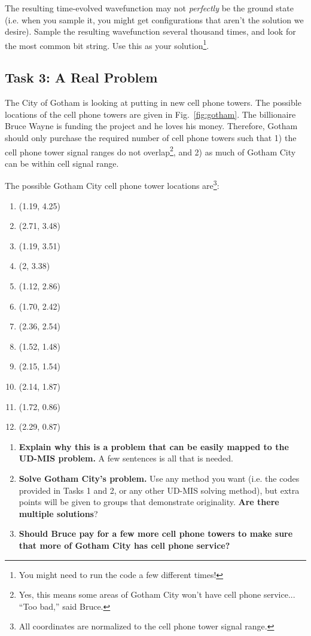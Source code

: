 \documentclass[12pt]{article}
\begin{document}
The resulting time-evolved wavefunction may not \textit{perfectly} be the ground state (i.e. when you sample it, you might get configurations that aren't the solution we desire).
Sample the resulting wavefunction several thousand times, and look for the most common bit string.
Use this as your solution\footnote{You might need to run the code a few different times!}.

\subsection*{Task 3: A Real Problem}

The City of Gotham is looking at putting in new cell phone towers.
The possible locations of the cell phone towers are given in Fig.~\ref{fig:gotham}.
The billionaire Bruce Wayne is funding the project and he loves his money. 
Therefore, Gotham should only purchase the required number of cell phone towers such that 1) the cell phone tower signal ranges do not overlap\footnote{Yes, this means some areas of Gotham City won't have cell phone service... ``Too bad,'' said Bruce.}, and 2) as much of Gotham City can be within cell signal range. 

The possible Gotham City cell phone tower locations are\footnote{All coordinates are normalized to the cell phone tower signal range.}:
\begin{enumerate}
	\item (1.19, 4.25)
	\item (2.71, 3.48)
	\item (1.19, 3.51)
	\item (2, 3.38)
	\item (1.12, 2.86)
	\item (1.70, 2.42)
	\item (2.36, 2.54)
	\item (1.52, 1.48)
	\item (2.15, 1.54)
	\item (2.14, 1.87)
	\item (1.72, 0.86)
	\item (2.29, 0.87)
\end{enumerate}

\begin{enumerate}
	\item {\bf Explain why this is a problem that can be easily mapped to the UD-MIS problem.} A few sentences is all that is needed.
	\item {\bf Solve Gotham City's problem.} Use any method you want (i.e. the codes provided in Tasks 1 and 2, or any other UD-MIS solving method), but extra points will be given to groups that demonstrate originality. \textbf{Are there multiple solutions}?
	\item {\bf Should Bruce pay for a few more cell phone towers to make sure that more of Gotham City has cell phone service?}
\end{enumerate}
\end{document}
